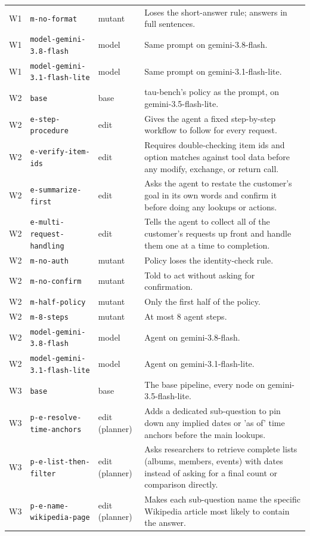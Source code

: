\begin{table}[p]
\begin{tabular}{@{}lllp{6.3cm}@{}}
W1 & \texttt{m-no-format} & mutant & Loses the short-answer rule; answers in full sentences. \\
W1 & \texttt{model-gemini-3.8-flash} & model & Same prompt on gemini-3.8-flash. \\
W1 & \texttt{model-gemini-3.1-flash-lite} & model & Same prompt on gemini-3.1-flash-lite. \\
\addlinespace
W2 & \texttt{base} & base & tau-bench's policy as the prompt, on gemini-3.5-flash-lite. \\
W2 & \texttt{e-step-procedure} & edit & Gives the agent a fixed step-by-step workflow to follow for every request. \\
W2 & \texttt{e-verify-item-ids} & edit & Requires double-checking item ids and option matches against tool data before any modify, exchange, or return call. \\
W2 & \texttt{e-summarize-first} & edit & Asks the agent to restate the customer's goal in its own words and confirm it before doing any lookups or actions. \\
W2 & \texttt{e-multi-request-handling} & edit & Tells the agent to collect all of the customer's requests up front and handle them one at a time to completion. \\
W2 & \texttt{m-no-auth} & mutant & Policy loses the identity-check rule. \\
W2 & \texttt{m-no-confirm} & mutant & Told to act without asking for confirmation. \\
W2 & \texttt{m-half-policy} & mutant & Only the first half of the policy. \\
W2 & \texttt{m-8-steps} & mutant & At most 8 agent steps. \\
W2 & \texttt{model-gemini-3.8-flash} & model & Agent on gemini-3.8-flash. \\
W2 & \texttt{model-gemini-3.1-flash-lite} & model & Agent on gemini-3.1-flash-lite. \\
\addlinespace
W3 & \texttt{base} & base & The base pipeline, every node on gemini-3.5-flash-lite. \\
W3 & \texttt{p-e-resolve-time-anchors} & edit (planner) & Adds a dedicated sub-question to pin down any implied dates or 'as of' time anchors before the main lookups. \\
W3 & \texttt{p-e-list-then-filter} & edit (planner) & Asks researchers to retrieve complete lists (albums, members, events) with dates instead of asking for a final count or comparison directly. \\
W3 & \texttt{p-e-name-wikipedia-page} & edit (planner) & Makes each sub-question name the specific Wikipedia article most likely to contain the answer. \\

\end{tabular}
\end{table}
